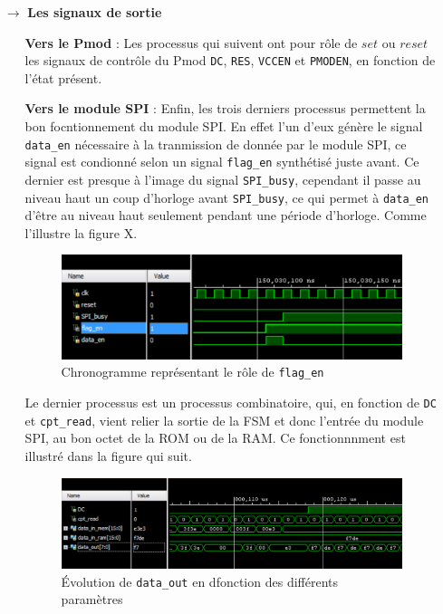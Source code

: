 \documentclass[11pt]{article}
\begin{document}
\begin{itemize}
\begin{itemize}
\end{itemize}

\item[$\rightarrow$] \textbf{Les signaux de sortie}

\begin{itemize}

\item[\textbullet] \textbf{Vers le Pmod} : Les processus qui suivent ont pour rôle de $set$ ou $reset$ les signaux de contrôle du Pmod \texttt{DC}, \texttt{RES}, \texttt{VCCEN} et \texttt{PMODEN}, en fonction de l'état présent.

\item[\textbullet] \textbf{Vers le module SPI} : Enfin, les trois derniers processus permettent la bon focntionnement du module SPI. En effet l'un d'eux génère le signal \texttt{data\_en} nécessaire à la tranmission de donnée par le module SPI, ce signal est condionné selon un signal \texttt{flag\_en} synthétisé juste avant. Ce dernier est presque à l'image du signal \texttt{SPI\_busy}, cependant il passe au niveau haut un coup d'horloge avant \texttt{SPI\_busy}, ce qui permet à \texttt{data\_en} d'être au niveau haut seulement pendant une période d'horloge. Comme l'illustre la figure X.

\begin{figure}[H]
\begin{center}
\includegraphics[scale = 0.4, keepaspectratio]{chrono_flag_en}
\caption{Chronogramme représentant le rôle de \texttt{flag\_en}}
\end{center}
\end{figure}

Le dernier processus est un processus combinatoire, qui, en fonction de \texttt{DC} et \texttt{cpt\_read}, vient relier la sortie de la FSM et donc l'entrée du module SPI, au bon octet de la ROM ou de la RAM. Ce fonctionnnment est illustré dans la figure qui suit.

\begin{figure}[H]
\begin{center}
\includegraphics[scale = 0.4, keepaspectratio]{chrono_out}
\caption{Évolution de \texttt{data\_out} en dfonction des différents paramètres}
\end{center}
\end{figure}


\end{itemize}
\end{itemize}
\end{document}
